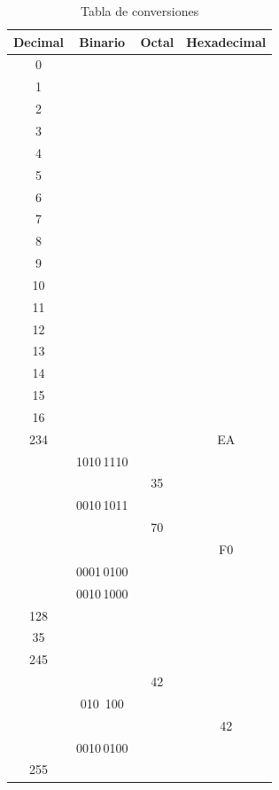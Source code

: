 \documentclass[12pt]{article}
\begin{document}
\begin{table}[h]

    \centering

    \caption{Tabla de conversiones}
    \label{tablaConversiones}

    \begin{tabular}{ | c | c | c | c | }
        \hline
        Decimal & Binario & Octal & Hexadecimal \\
        \hline
        0 & \hspace{8em} & \hspace{6em} & \hspace{6em} \\
        \hline
        1 & & & \\
        \hline
        2 & & & \\
        \hline
        3 & & & \\
        \hline
        4 & & & \\
        \hline
        5 & & & \\
        \hline
        6 & & & \\
        \hline
        7 & & & \\
        \hline
        8 & & & \\
        \hline
        9 & & & \\
        \hline
        10 & & & \\
        \hline
        11 & & & \\
        \hline
        12 & & & \\
        \hline
        13 & & & \\
        \hline
        14 & & & \\
        \hline
        15 & & & \\
        \hline
        16 & & & \\
        \hline
        234 & & & EA \\
        \hline
        \hspace{6em} & 1010\,1110 & & \\
        \hline
        & & 35 & \\
        \hline
        & 0010\,1011 & & \\
        \hline
        & & 70 & \\
        \hline
        & & & F0 \\
        \hline
        & 0001\,0100 & & \\
        \hline
        & 0010\,1000 & & \\
        \hline
        128 & & & \\
        \hline
        35 & & & \\
        \hline
        245 & & & \\
        \hline
        & & 42 & \\
        \hline
        & 010\, 100 & & \\
        \hline
        & & & 42 \\
        \hline
        & 0010\,0100 & & \\
        \hline
        255 & & & \\
        \hline
    \end{tabular}

\end{table}
\end{document}
